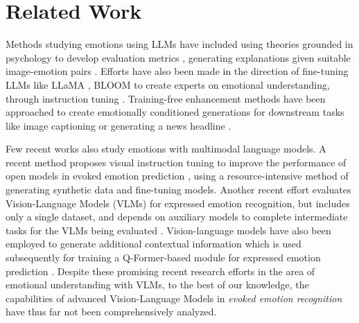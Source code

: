 \section{Related Work}
\label{sec:related_work}
 
Methods studying emotions using LLMs have included using theories grounded in psychology to develop evaluation metrics \cite{wang2023emotional, regan2024can}, generating explanations given suitable image-emotion pairs \cite{deng2023socratis}. Efforts have also been made in the direction of fine-tuning LLMs like LLaMA \cite{touvron2023llama}, BLOOM \cite{workshop2022bloom} to create experts on emotional understanding, through instruction tuning \cite{liu2024emollms}. Training-free enhancement methods have been approached to create emotionally conditioned generations for downstream tasks like image captioning or generating a news headline \cite{li2024enhancing}. 

Few recent works also study emotions with multimodal language models. A recent method proposes visual instruction tuning to improve the performance of open models in evoked emotion prediction \cite{xie2024emovit}, using a resource-intensive method of generating synthetic data and fine-tuning models. Another recent effort evaluates Vision-Language Models (VLMs) for expressed emotion recognition, but includes only a single dataset, and depends on auxiliary models to complete intermediate tasks for the VLMs being evaluated \cite{etesam2024contextual}. Vision-language models have also been employed to generate additional contextual information which is used subsequently for training a Q-Former-based module for expressed emotion prediction \cite{xenos2024vllms}. Despite these promising recent research efforts in the area of emotional understanding with VLMs, to the best of our knowledge, the capabilities of advanced Vision-Language Models in \textit{evoked emotion recognition} have thus far not been comprehensively analyzed. 


